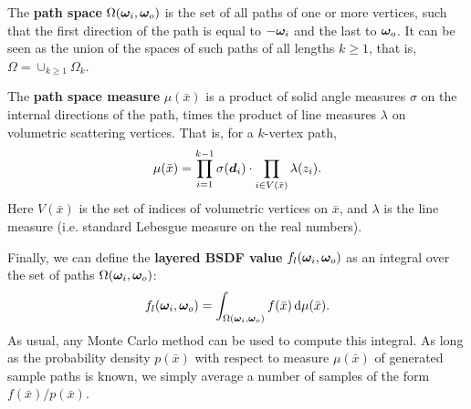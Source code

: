 The {\bf path space} $\Omega(\bm{\omega}_i, \bm{\omega}_o)$ is the set of all paths of one or more vertices, such that the first direction of the path is equal to $-\bm{\omega}_i$ and the last to $\bm{\omega}_o$. It can be seen as the union of the spaces of such paths of all lengths $k \geq 1$, that is, $\Omega = \cup_{k \geq 1} \Omega_k$.

The {\bf path space measure} $\mu(\bar x)$ is a product of solid angle measures $\sigma$ on the internal directions of the path, times the product of line measures $\lambda$ on volumetric scattering vertices.
That is, for a $k$-vertex path,
\begin{equation}
\mu(\bar x) = \prod_{i=1}^{k-1} \sigma(\bm{d}_i) \cdot \prod_{i \in V(\bar x)} \lambda(z_i).
\end{equation}
Here $V(\bar x)$ is the set of indices of volumetric vertices on $\bar x$, and $\lambda$ is the line measure (i.e. standard Lebesgue measure on the real numbers).

Finally, we can define the {\bf layered BSDF value} $f_l(\bm{\omega}_i, \bm{\omega}_o)$ as an integral over the set of paths $\Omega(\bm{\omega}_i, \bm{\omega}_o)$:
%
\begin{equation}
\label{eq:pathintegral}
	f_l(\bm{\omega}_i, \bm{\omega}_o) = \int_{\Omega(\bm{\omega}_i, \bm{\omega}_o)} f(\bar x) \,\mathrm{d} \mu(\bar x).
\end{equation}
%
As usual, any Monte Carlo method can be used to compute this integral. As long as the probability density $p(\bar x)$ with respect to measure $\mu(\bar x)$ of generated sample paths is known, we simply average a number of samples of the form $f(\bar x) / p(\bar x)$.


